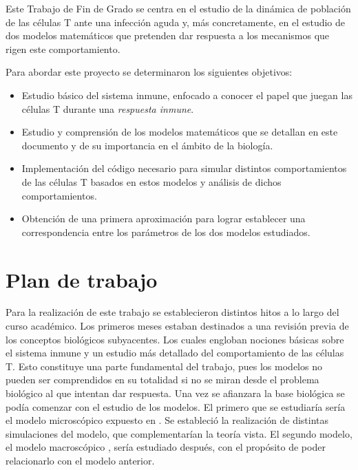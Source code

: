 Este Trabajo de Fin de Grado se centra en el estudio de la dinámica de población de las células T ante una infección aguda y, más concretamente, en el estudio de dos modelos matemáticos que pretenden dar respuesta a los mecanismos que rigen este comportamiento.

Para abordar este proyecto se determinaron los siguientes objetivos:

 \begin{itemize}
 	
	\item Estudio básico del sistema inmune, enfocado a conocer el papel que juegan las células T durante una \textit{respuesta inmune}.
	
	\item Estudio y comprensión de los modelos matemáticos que se detallan en este documento y de su importancia en el ámbito de la biología.
	
 	\item Implementación del código necesario para simular distintos comportamientos de las células T basados en estos modelos y análisis de dichos comportamientos. 
 	
 	\item Obtención de una primera aproximación para lograr establecer una correspondencia entre los parámetros de los dos modelos estudiados. 
 \end{itemize}


\section{Plan de trabajo}

Para la realización de este trabajo se establecieron distintos hitos a lo largo del curso académico. Los primeros meses estaban destinados a una revisión previa de los conceptos biológicos subyacentes. Los cuales engloban nociones básicas sobre el sistema inmune y un estudio más detallado del comportamiento de las células T. Esto constituye una parte fundamental del trabajo, pues los modelos no pueden ser comprendidos en su totalidad si no se miran desde el problema biológico al que intentan dar respuesta. Una vez se afianzara la base biológica se podía comenzar con el estudio de los modelos. El primero que se estudiaría sería el modelo microscópico expuesto en \cite{JTB}. Se estableció la realización de distintas simulaciones del modelo, que complementarían la teoría vista. El segundo modelo, el modelo macroscópico \citep{arias2015growth}, sería estudiado después, con el propósito de poder relacionarlo con el modelo anterior. 


